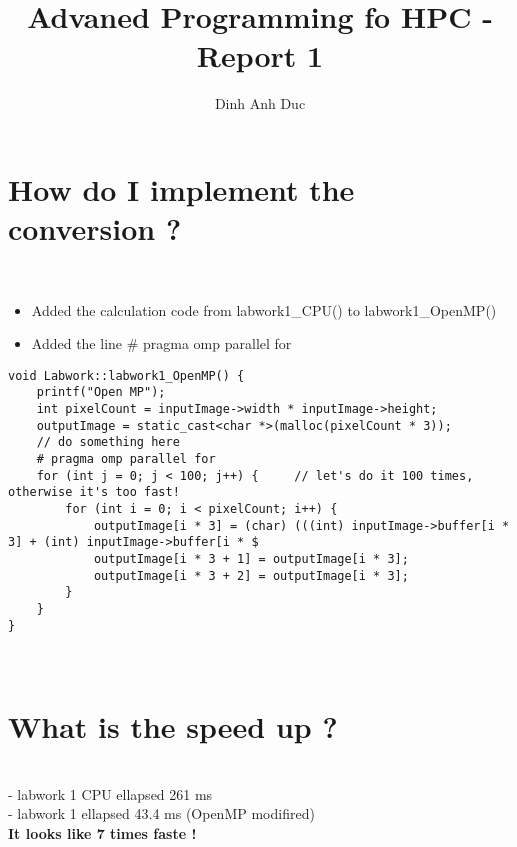 \documentclass{article}
\title{Advaned Programming fo HPC - Report 1}
\author{Dinh Anh Duc}
\begin{document}
\maketitle

\section*{How do I implement the conversion ?}
\\
\begin{itemize}
\item Added the calculation code from labwork1_CPU() to labwork1_OpenMP()
\item Added the line # pragma omp parallel for 
\end{itemize}
\begin{lstlisting}
void Labwork::labwork1_OpenMP() {
    printf("Open MP");
    int pixelCount = inputImage->width * inputImage->height;
    outputImage = static_cast<char *>(malloc(pixelCount * 3));
    // do something here
    # pragma omp parallel for
    for (int j = 0; j < 100; j++) {     // let's do it 100 times, otherwise it's too fast!
        for (int i = 0; i < pixelCount; i++) {
            outputImage[i * 3] = (char) (((int) inputImage->buffer[i * 3] + (int) inputImage->buffer[i * $
            outputImage[i * 3 + 1] = outputImage[i * 3];
            outputImage[i * 3 + 2] = outputImage[i * 3];
        }
    }
}
\end{lstlisting}
\\
\section*{What is the speed up ?}
\\
- labwork 1 CPU ellapsed 261 ms
\\
- labwork 1 ellapsed 43.4 ms (OpenMP modifired)
\\
\textbf{It looks like 7 times faste !} 
\end{document}
